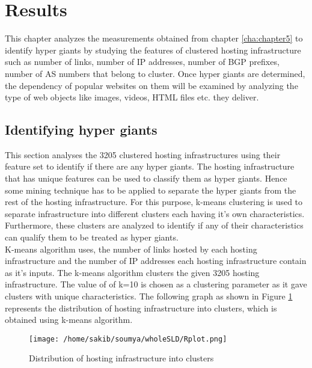 \section{Results\label{cha:chapter6}}
\noindent This chapter analyzes the measurements obtained from chapter \ref{cha:chapter5} to identify hyper giants by studying the features of clustered hosting infrastructure such as number of links, number of IP addresses,  number of BGP prefixes, number of AS numbers that belong to cluster. Once hyper giants are determined, the dependency of popular websites on them will be examined by analyzing the type of web objects like images, videos, HTML files etc. they deliver.\\

\subsection{Identifying hyper giants}
\noindent This section analyses the 3205 clustered hosting infrastructures using their feature set to identify if there are any hyper giants. The hosting infrastructure that has unique features can be used to classify them as  hyper giants. Hence some mining technique has to be applied to separate the hyper giants from the rest of the hosting infrastructure. For this purpose, k-means clustering is used to separate infrastructure into different clusters each having it's own characteristics. Furthermore, these clusters are analyzed to identify if any of their characteristics can qualify them to be treated as hyper giants.\\ 

\noindent K-means algorithm uses, the number of links hosted by each hosting infrastructure and the number of IP addresses each hosting infrastructure contain as it's inputs. The k-means algorithm clusters the given 3205 hosting infrastructure. The value of of k=10 is chosen as a clustering parameter as it gave clusters with unique characteristics. The following graph as shown in Figure \ref{fig:cluster} represents the distribution of hosting infrastructure into clusters, which is obtained using k-means algorithm.\\

\begin{figure}[htb]
  \centering
  \texttt{[image: /home/sakib/soumya/wholeSLD/Rplot.png]}\\
  \caption{Distribution of hosting infrastructure into clusters}
  \label{fig:cluster}
\end{figure}

